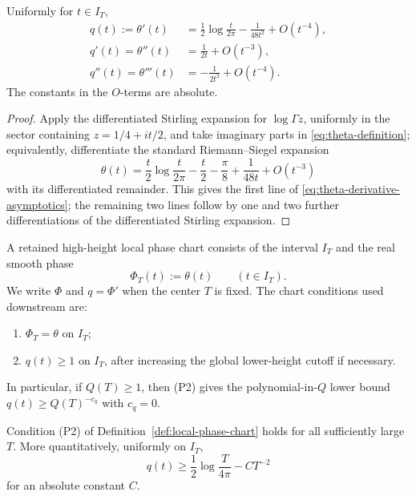 \begin{lemma}
\label{lem:theta-derivative-asymptotics}
Uniformly for \(t\in I_T\),
\begin{align}
\label{eq:theta-derivative-asymptotics}
q(t):=\theta'(t)
&=\frac12\log\frac{t}{2\pi}-\frac{1}{48t^2}+O(t^{-4}),\\
q'(t)=\theta''(t)
&=\frac{1}{2t}+O(t^{-3}),\\
q''(t)=\theta'''(t)
&=-\frac{1}{2t^2}+O(t^{-4}).
\end{align}
The constants in the \(O\)-terms are absolute.
\end{lemma}

\begin{proof}
Apply the differentiated Stirling expansion for \(\log\Gamma z\), uniformly
in the sector containing \(z=1/4+it/2\), and take imaginary parts in
\eqref{eq:theta-definition}; equivalently, differentiate the standard
Riemann--Siegel expansion
\[
\theta(t)=\frac{t}{2}\log\frac{t}{2\pi}-\frac{t}{2}-\frac{\pi}{8}
          +\frac{1}{48t}+O(t^{-3})
\]
with its differentiated remainder.  This gives the first line of
\eqref{eq:theta-derivative-asymptotics}; the remaining two lines follow by
one and two further differentiations of the differentiated Stirling expansion.
\end{proof}

\begin{definition}
\label{def:local-phase-chart}
A retained high-height local phase chart consists of the interval \(I_T\)
and the real smooth phase
\[
        \Phi_T(t):=\theta(t)\qquad (t\in I_T).
\]
We write \(\Phi\) and \(q=\Phi'\) when the center \(T\) is fixed.  The chart
conditions used downstream are:
\begin{enumerate}[label=\textup{(P\arabic*)},leftmargin=*]
\item \(\Phi_T=\theta\) on \(I_T\);
\item \(q(t)\ge 1\) on \(I_T\), after increasing the global lower-height
      cutoff if necessary.
\end{enumerate}
In particular, if \(Q(T)\ge1\), then (P2) gives the polynomial-in-\(Q\)
lower bound \(q(t)\ge Q(T)^{-c_q}\) with \(c_q=0\).
\end{definition}

\begin{lemma}
\label{lem:phase-derivative-lower-bound}
Condition \textup{(P2)} of Definition~\ref{def:local-phase-chart} holds for
all sufficiently large \(T\).  More quantitatively, uniformly on \(I_T\),
\[
        q(t)\ge \frac12\log\frac{T}{4\pi}-C T^{-2}
\]
for an absolute constant \(C\).
\end{lemma}

